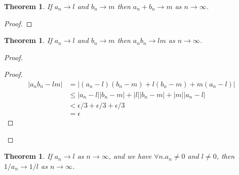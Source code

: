 \documentclass{article}
\let\qed\relax
\newtheorem{theorem}[axiom]{Theorem}
\theoremstyle{definition}
\begin{document}
    \begin{theorem}
        \label{theorem:limit_sum}
        If $a_n \rightarrow l$ and $b_n \rightarrow m$ then $a_n + b_n \rightarrow m$ as $n \rightarrow
        \infty$.
    \end{theorem}

    \begin{proof}
        \pf
        \qed
    \end{proof}

    \begin{theorem}
        If $a_n \rightarrow l$ and $b_n \rightarrow m$ then $a_n b_n \rightarrow lm$ as $n \rightarrow \infty$.
    \end{theorem}

    \begin{proof}
        \pf
        \begin{proof}
            \pf
            \begin{align*}
                |a_n b_n - lm| & = |(a_n - l) (b_n - m) + l(b_n - m) + m(a_n - l)| \\
                & \leq |a_n - l| |b_n - m| + |l| |b_n - m| + |m| |a_n - l| \\
                & < \epsilon / 3 + \epsilon / 3 + \epsilon / 3 \\
                & = \epsilon
            \end{align*}
        \end{proof}
        \qed
    \end{proof}

    \begin{theorem}
        If $a_n \rightarrow l$ as $n \rightarrow \infty$, and we have $\forall n. a_n \neq 0$ and $l \neq 0$,
        then $1/a_n \rightarrow 1/l$ as $n \rightarrow \infty$.
    \end{theorem}
\end{document}
